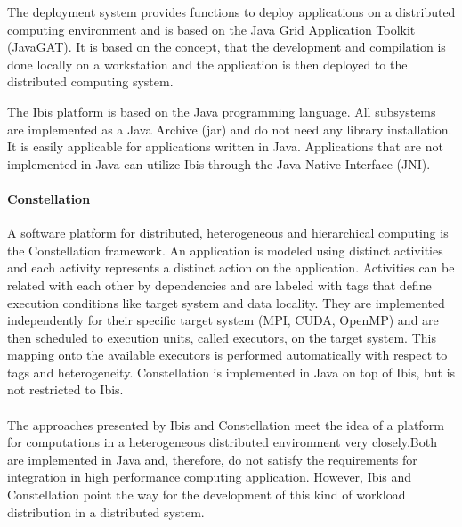 The deployment system provides functions to deploy applications on a
distributed computing environment and is based on the Java Grid
Application Toolkit (JavaGAT).  It is based on the concept, that the
development and compilation is done locally on a workstation and the
application is then deployed to the distributed computing system.

The Ibis platform is based on the Java programming language. All subsystems are implemented as
a Java Archive (jar) and do not need any library installation. It is easily
applicable for applications written in Java. Applications that are not implemented in Java 
can utilize Ibis through the Java Native Interface (JNI).

\paragraph*{Constellation}
A software platform for distributed, heterogeneous and hierarchical
computing is the Constellation \cite{ref:constellation} framework. An
application is modeled using distinct activities and each activity
represents a distinct action on the application.  Activities can be
related with each other by dependencies and are labeled with tags that
define execution conditions like target system and data locality.
They are implemented independently for their specific target system
(MPI, CUDA, OpenMP) and are then scheduled to execution units, called
executors, on the target system. This mapping onto the available
executors is performed automatically with respect to tags and
heterogeneity. Constellation is implemented in Java on top of Ibis,
but is not restricted to Ibis.

\paragraph*{}
The approaches presented by Ibis and Constellation meet the idea of a
platform for computations in a heterogeneous distributed environment
very closely.Both are implemented in Java and, therefore, do not
satisfy the requirements for integration in high performance computing
application. However, Ibis and Constellation point the way for the
development of this kind of workload distribution in a distributed
system.


\cleardoublepage

